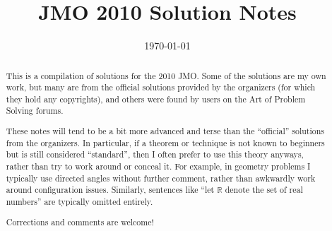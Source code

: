 \documentclass[11pt]{scrartcl}
\title{JMO 2010 Solution Notes}
\date{\today}
\begin{document}
\maketitle

\begin{abstract}
This is a compilation of solutions
for the 2010 JMO.
Some of the solutions are my own work,
but many are from the official solutions provided by the organizers
(for which they hold any copyrights),
and others were found by users on the Art of Problem Solving forums.

These notes will tend to be a bit more advanced and terse than the ``official''
solutions from the organizers.
In particular, if a theorem or technique is not known to beginners
but is still considered ``standard'', then I often prefer to
use this theory anyways, rather than try to work around or conceal it.
For example, in geometry problems I typically use directed angles
without further comment, rather than awkwardly work around configuration issues.
Similarly, sentences like ``let $\mathbb{R}$ denote the set of real numbers''
are typically omitted entirely.

Corrections and comments are welcome!
\end{abstract}

\tableofcontents
\newpage

\addtocounter{section}{-1}
\end{document}
